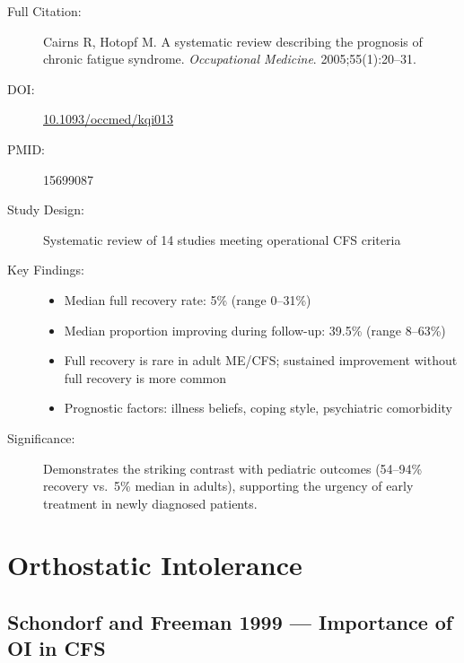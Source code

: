 \begin{description}
    \item[Full Citation:] Cairns R, Hotopf M\@. A systematic review describing the prognosis of chronic fatigue syndrome. \textit{Occupational Medicine}. 2005;55(1):20--31.
    \item[DOI:] \href{https://doi.org/10.1093/occmed/kqi013}{10.1093/occmed/kqi013}
    \item[PMID:] 15699087
    \item[Study Design:] Systematic review of 14 studies meeting operational CFS criteria
    \item[Key Findings:]
    \begin{itemize}
        \item Median full recovery rate: 5\% (range 0--31\%)
        \item Median proportion improving during follow-up: 39.5\% (range 8--63\%)
        \item Full recovery is rare in adult ME/CFS; sustained improvement without full recovery is more common
        \item Prognostic factors: illness beliefs, coping style, psychiatric comorbidity
    \end{itemize}
    \item[Significance:] Demonstrates the striking contrast with pediatric outcomes (54--94\% recovery vs.\ 5\% median in adults), supporting the urgency of early treatment in newly diagnosed patients.
\end{description}

\section{Orthostatic Intolerance}
\label{sec:bib-orthostatic}

\subsection{Schondorf and Freeman 1999 --- Importance of OI in CFS}

